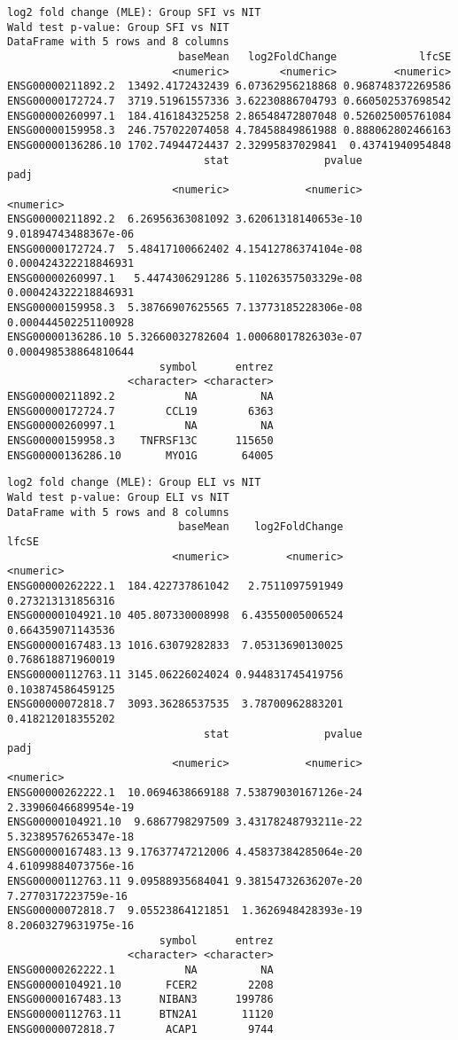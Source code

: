 \documentclass[
]{article}
\begin{document}
\begin{verbatim}
log2 fold change (MLE): Group SFI vs NIT 
Wald test p-value: Group SFI vs NIT 
DataFrame with 5 rows and 8 columns
                           baseMean   log2FoldChange             lfcSE
                          <numeric>        <numeric>         <numeric>
ENSG00000211892.2  13492.4172432439 6.07362956218868 0.968748372269586
ENSG00000172724.7  3719.51961557336 3.62230886704793 0.660502537698542
ENSG00000260997.1  184.416184325258 2.86548472807048 0.526025005761084
ENSG00000159958.3  246.757022074058 4.78458849861988 0.888062802466163
ENSG00000136286.10 1702.74944724437 2.32995837029841  0.43741940954848
                               stat               pvalue                 padj
                          <numeric>            <numeric>            <numeric>
ENSG00000211892.2  6.26956363081092 3.62061318140653e-10 9.01894743488367e-06
ENSG00000172724.7  5.48417100662402 4.15412786374104e-08 0.000424322218846931
ENSG00000260997.1   5.4474306291286 5.11026357503329e-08 0.000424322218846931
ENSG00000159958.3  5.38766907625565 7.13773185228306e-08 0.000444502251100928
ENSG00000136286.10 5.32660032782604 1.00068017826303e-07 0.000498538864810644
                        symbol      entrez
                   <character> <character>
ENSG00000211892.2           NA          NA
ENSG00000172724.7        CCL19        6363
ENSG00000260997.1           NA          NA
ENSG00000159958.3    TNFRSF13C      115650
ENSG00000136286.10       MYO1G       64005
\end{verbatim}

\begin{verbatim}
log2 fold change (MLE): Group ELI vs NIT 
Wald test p-value: Group ELI vs NIT 
DataFrame with 5 rows and 8 columns
                           baseMean    log2FoldChange             lfcSE
                          <numeric>         <numeric>         <numeric>
ENSG00000262222.1  184.422737861042   2.7511097591949 0.273213131856316
ENSG00000104921.10 405.807330008998  6.43550005006524 0.664359071143536
ENSG00000167483.13 1016.63079282833  7.05313690130025 0.768618871960019
ENSG00000112763.11 3145.06226024024 0.944831745419756 0.103874586459125
ENSG00000072818.7  3093.36286537535  3.78700962883201 0.418212018355202
                               stat               pvalue                 padj
                          <numeric>            <numeric>            <numeric>
ENSG00000262222.1  10.0694638669188 7.53879030167126e-24 2.33906046689954e-19
ENSG00000104921.10  9.6867798297509 3.43178248793211e-22 5.32389576265347e-18
ENSG00000167483.13 9.17637747212006 4.45837384285064e-20 4.61099884073756e-16
ENSG00000112763.11 9.09588935684041 9.38154732636207e-20  7.2770317223759e-16
ENSG00000072818.7  9.05523864121851  1.3626948428393e-19 8.20603279631975e-16
                        symbol      entrez
                   <character> <character>
ENSG00000262222.1           NA          NA
ENSG00000104921.10       FCER2        2208
ENSG00000167483.13      NIBAN3      199786
ENSG00000112763.11      BTN2A1       11120
ENSG00000072818.7        ACAP1        9744
\end{verbatim}
\end{document}
